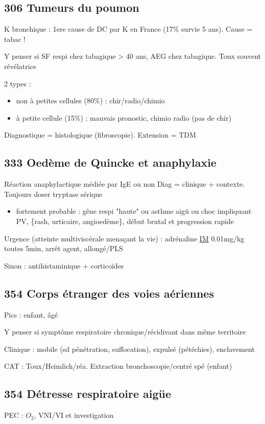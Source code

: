 \documentclass[11pt]{article}
\begin{document}
\subsection{306 Tumeurs du poumon}
\label{sec:org3696f47}
K bronchique : 1ere cause de DC par K en France (17\% survie 5 ans). Cause = tabac !

Y penser si SF respi chez tabagique > 40 ans, AEG chez tabagique. Toux souvent révélatrice

2 types :
\begin{itemize}
\item non à petites cellules (80\%) : chir/radio/chimio
\item à petite cellule (15\%) : mauvais pronostic, chimio \textpm{} radio (pas de chir)
\end{itemize}

Diagnostique = histologique (fibroscopie). Extension = TDM
\subsection{333 Oedème de Quincke et anaphylaxie}
\label{sec:orgb0ca088}
Réaction anaphylactique médiée par IgE ou non
Diag = clinique + contexte. Toujours doser tryptase sérique
\begin{itemize}
\item fortement probable : gêne respi "haute" ou asthme aigü ou choc impliquant PV,
\{rash, urticaire, angioedème\}, début brutal et progression rapide
\end{itemize}
\faBomb Urgence (atteinte multiviscérale menaçant la vie) : adrénaline \uline{IM}
0.01mg/kg toutes 5min, arrêt agent, allongé/PLS 

Sinon : antihistaminique + corticoïdes

\subsection{354 Corps étranger des voies aériennes}
\label{sec:orgae6d154}
Pics : enfant, âgé

Y penser si symptôme respiratoire chronique/récidivant dans même territoire

Clinique : mobile (sd pénétration, suffocation), expulsé (pétéchies), enclavement

CAT : Toux/Heimlich/réa. Extraction bronchoscopie/centré spé (enfant)
\subsection{354 Détresse respiratoire aigüe}
\label{sec:org6969990}
PEC : \(O_2\), VNI/VI et investigation
\end{document}
